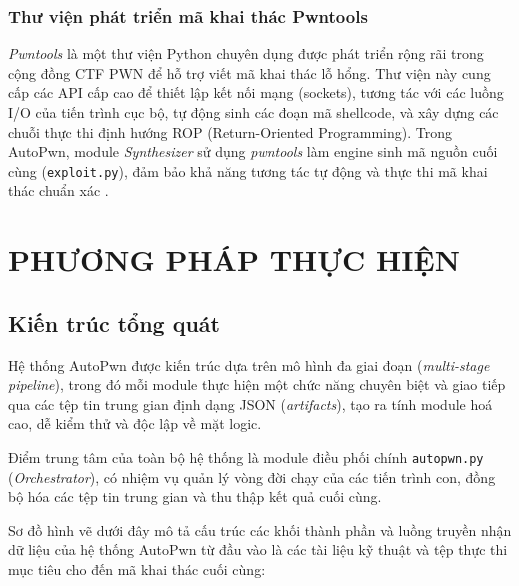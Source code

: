 \documentclass[final]{hcmuitthesis}
\begin{document}
\subsection{Thư viện phát triển mã khai thác Pwntools}
\textit{Pwntools} là một thư viện Python chuyên dụng được phát triển rộng rãi trong cộng đồng CTF PWN để hỗ trợ viết mã khai thác lỗ hổng. Thư viện này cung cấp các API cấp cao để thiết lập kết nối mạng (sockets), tương tác với các luồng I/O của tiến trình cục bộ, tự động sinh các đoạn mã shellcode, và xây dựng các chuỗi thực thi định hướng ROP (Return-Oriented Programming). Trong AutoPwn, module \textit{Synthesizer} sử dụng \textit{pwntools} làm engine sinh mã nguồn cuối cùng (\texttt{exploit.py}), đảm bảo khả năng tương tác tự động và thực thi mã khai thác chuẩn xác \cite{pwntools2025}.

\chapter{PHƯƠNG PHÁP THỰC HIỆN}

\section{Kiến trúc tổng quát}
Hệ thống AutoPwn được kiến trúc dựa trên mô hình đa giai đoạn (\textit{multi-stage pipeline}), trong đó mỗi module thực hiện một chức năng chuyên biệt và giao tiếp qua các tệp tin trung gian định dạng JSON (\textit{artifacts}), tạo ra tính module hoá cao, dễ kiểm thử và độc lập về mặt logic.

Điểm trung tâm của toàn bộ hệ thống là module điều phối chính \texttt{autopwn.py} (\textit{Orchestrator}), có nhiệm vụ quản lý vòng đời chạy của các tiến trình con, đồng bộ hóa các tệp tin trung gian và thu thập kết quả cuối cùng.

Sơ đồ hình vẽ dưới đây mô tả cấu trúc các khối thành phần và luồng truyền nhận dữ liệu của hệ thống AutoPwn từ đầu vào là các tài liệu kỹ thuật và tệp thực thi mục tiêu cho đến mã khai thác cuối cùng:
\end{document}

